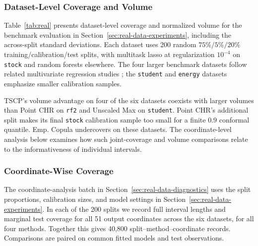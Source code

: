 \subsubsection{Dataset-Level Coverage and Volume}

Table~\ref{tab:real} presents dataset-level coverage and normalized volume
for the benchmark evaluation in Section~\ref{sec:real-data-experiments},
including the across-split standard deviations. Each dataset uses 200
random $75\%/5\%/20\%$ training/calibration/test splits, with multitask
lasso at regularization $10^{-4}$ on \texttt{stock} and random forests
elsewhere. The four larger benchmark datasets follow related multivariate
regression studies \citep{pmlr-v258-park25c,dheur2025unified}; the
\texttt{student} and \texttt{energy} datasets emphasize smaller
calibration samples.

TSCP's volume advantage on four of the six datasets coexists with larger
volumes than Point CHR on \texttt{rf2} and Unscaled Max on
\texttt{student}. Point CHR's additional split makes its final
\texttt{stock} calibration sample too small for a finite $0.9$ conformal
quantile. Emp. Copula undercovers on these datasets. The coordinate-level
analysis below examines how such joint-coverage and volume comparisons
relate to the informativeness of individual intervals.

\begin{table}[!htbp]

\caption{Performance of the proposed TSCP method and alternative conformal prediction approaches on real datasets. Results are averaged over $200$ random splits of the data into training/calibration/and test subsets, with one standard deviation reported in parentheses. The target coverage level is $0.9$. Coverage values below the target are highlighted in \textcolor{red}{red}, and the smallest volume among methods achieving valid coverage is highlighted in \textbf{bold}.}
\label{tab:real}
\end{table}

\FloatBarrier

\subsubsection{Coordinate-Wise Coverage}
The coordinate-analysis batch in Section~\ref{sec:real-data-diagnostics}
uses the split proportions, calibration sizes, and model settings in
Section~\ref{sec:real-data-experiments}. In each of the 200 splits we record
full interval lengths and marginal test coverage for all 51 output
coordinates across the six datasets, for all four methods. Together this
gives 40,800 split--method--coordinate records. Comparisons are paired on
common fitted models and test observations.

